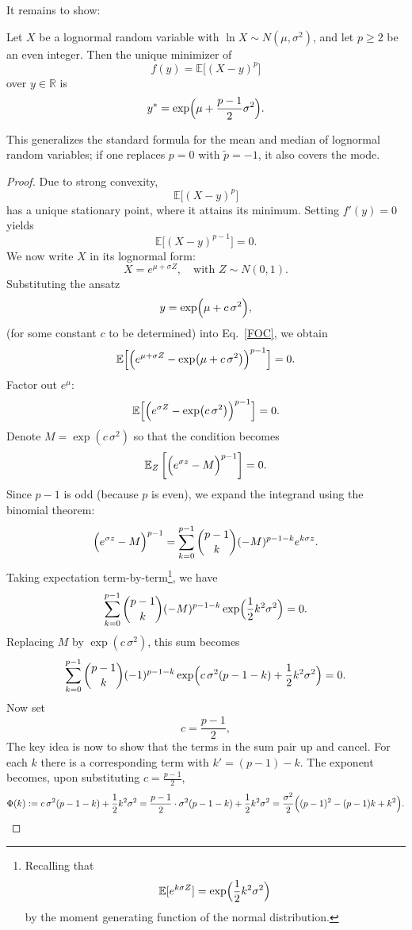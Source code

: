 It remains to show:
\begin{lemma}\label{lemma:lognormal-p-estimator}
Let $X$ be a lognormal random variable with $\ln X\sim N(\mu,\sigma^2)$, and let $p\ge 2$ be an even integer. Then the unique minimizer of
\[
f(y) = \mathbb{E}\bigl[(X-y)^p\bigr]
\]
over $y\in\mathbb{R}$ is
\[
y^* = \exp\Bigl(\mu+\frac{p-1}{2}\sigma^2\Bigr).
\]
\end{lemma}
This generalizes the standard formula for the mean and median of lognormal random variables; if one replaces $p=0$ with $\tilde{p}=-1$, it also covers the mode.
\begin{proof}
Due to strong convexity, 
\begin{equation} 
\mathbb{E}\bigl[(X-y)^{p}\bigr]
\end{equation}
has a unique stationary point, where it attains its minimum.
Setting $f'(y)=0$ yields
\begin{equation} \label{FOC}
\mathbb{E}\bigl[(X-y)^{p-1}\bigr]=0.
\end{equation}
We now write $X$ in its lognormal form:
\[
X = e^{\mu+\sigma Z},\quad \text{with } Z\sim N(0,1).
\]
Substituting the ansatz
\[
y = \exp\Bigl(\mu+c\,\sigma^2\Bigr),
\]
(for some constant $c$ to be determined) into Eq.~\ref{FOC}, we obtain
\[
\mathbb{E}\Bigl[\Bigl(e^{\mu+\sigma Z} - \exp\bigl(\mu+c\,\sigma^2\bigr)\Bigr)^{p-1}\Bigr]=0.
\]
Factor out $e^\mu$:
\[
\mathbb{E}\Bigl[\Bigl(e^{\sigma Z} - \exp(c\,\sigma^2)\Bigr)^{p-1}\Bigr]=0.
\]
Denote $M=\exp(c\,\sigma^2)$ so that the condition becomes
\[
\mathbb{E}_Z \left[ \Bigl(e^{\sigma z}-M\Bigr)^{p-1} \right]=0.
\]
Since $p-1$ is odd (because $p$ is even), we expand the integrand using the binomial theorem:
\[
\Bigl(e^{\sigma z}-M\Bigr)^{p-1} = \sum_{k=0}^{p-1} \binom{p-1}{k} (-M)^{p-1-k} e^{k\sigma z}.
\]
Taking expectation term-by-term\footnote{Recalling that
\[
\mathbb{E}[e^{k\sigma Z}] = \exp\Bigl(\frac{1}{2}k^2\sigma^2\Bigr)
\]
by the moment generating function of the normal distribution.}, we have
\[
\sum_{k=0}^{p-1} \binom{p-1}{k} (-M)^{p-1-k} \exp\Bigl(\frac{1}{2}k^2\sigma^2\Bigr)=0.
\]
Replacing $M$ by $\exp(c\,\sigma^2)$, this sum becomes
\[
\sum_{k=0}^{p-1} \binom{p-1}{k} (-1)^{p-1-k} \exp\Bigl(c\,\sigma^2(p-1-k)+\frac{1}{2}k^2\sigma^2\Bigr)=0.
\]
Now set 
\[
c = \frac{p-1}{2},
\]
The key idea is now to show that the terms in the sum pair up and cancel. For each $k$ there is a corresponding term with $k'=(p-1)-k$. The exponent becomes, upon substituting $c=\frac{p-1}{2}$,
\[
\Phi(k) := c\,\sigma^2(p-1-k)+\frac{1}{2}k^2\sigma^2 = \frac{p-1}{2} \cdot \sigma^2(p-1-k)+\frac{1}{2}k^2\sigma^2 = \frac{\sigma^2}{2}\Bigl((p-1)^2 - (p-1)k + k^2\Bigr).
\]
\end{proof}
